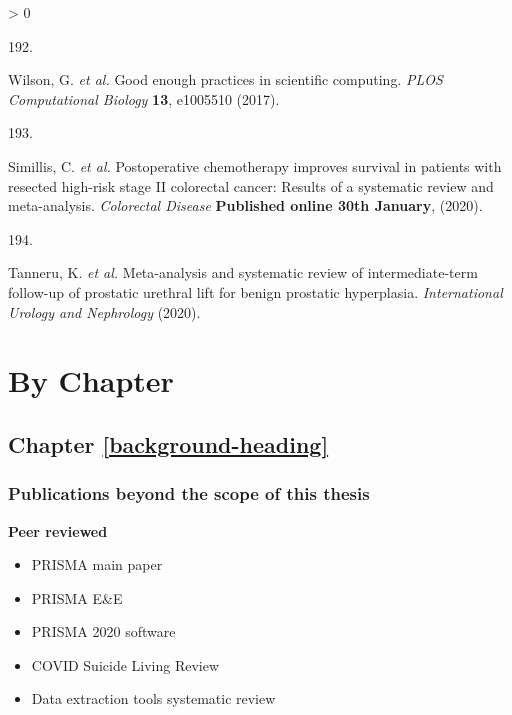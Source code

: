\documentclass[a4paper, twoside]{templates/ociamthesis}
\newlength{\cslhangindent}
\newlength{\csllabelwidth}
\newenvironment{CSLReferences}[3] %
 {%
  \setlength{\parindent}{0pt}
  \ifodd #1 \everypar{\setlength{\hangindent}{\cslhangindent}}\ignorespaces\fi
  \ifnum #2 > 0
  \setlength{\parskip}{#2\baselineskip}
  \fi
 }%
 {}
\newcommand{\CSLLeftMargin}[1]{\parbox[t]{\maxof{\widthof{#1}}{\csllabelwidth}}{#1}}
\newcommand{\CSLRightInline}[1]{\parbox[t]{\linewidth - \csllabelwidth}{#1}}
\begin{document}
\begin{CSLReferences}{0}{0}
\leavevmode\hypertarget{ref-wilson2017}{}%
\CSLLeftMargin{192. }
\CSLRightInline{Wilson, G. \emph{et al.} Good enough practices in scientific computing. \emph{PLOS Computational Biology} \textbf{13}, e1005510 (2017).}

\leavevmode\hypertarget{ref-simillis2020}{}%
\CSLLeftMargin{193. }
\CSLRightInline{Simillis, C. \emph{et al.} Postoperative chemotherapy improves survival in patients with resected high-risk stage {II} colorectal cancer: Results of a systematic review and meta-analysis. \emph{Colorectal Disease} \textbf{Published online 30th January}, (2020).}

\leavevmode\hypertarget{ref-tanneru2020}{}%
\CSLLeftMargin{194. }
\CSLRightInline{Tanneru, K. \emph{et al.} Meta-analysis and systematic review of intermediate-term follow-up of prostatic urethral lift for benign prostatic hyperplasia. \emph{International Urology and Nephrology} (2020).}

\end{CSLReferences}

\startappendices

\hypertarget{chapter-appendix-heading}{%
\chapter{By Chapter}\label{chapter-appendix-heading}}

\hypertarget{appendix-into}{%
\section{Chapter \ref{background-heading}}\label{appendix-into}}

\hypertarget{appendix-publications}{%
\subsection{Publications beyond the scope of this thesis}\label{appendix-publications}}

\textbf{Peer reviewed}

\begin{itemize}
\item
  PRISMA main paper
\item
  PRISMA E\&E
\item
  PRISMA 2020 software
\item
  COVID Suicide Living Review
\item
  Data extraction tools systematic review
\end{itemize}
\end{document}

